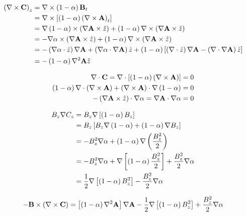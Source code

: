 \begin{equation}
    \begin{split}
        \left( \nabla \times\mathbf{C} \right)_z &= \nabla \times\left( 1-\alpha \right)\mathbf{B}_t \\
        &= \nabla \times\left[ \left( 1-\alpha \right)\left( \nabla \times\mathbf{A} \right)_t \right] \\
        &= \nabla\left( 1-\alpha \right)\times\left( \nabla\mathbf{A}\times\hat{z} \right) + \left( 1-\alpha \right)\nabla \times \left( \nabla\mathbf{A}\times\hat{z} \right) \\
        &= -\nabla\alpha\times\left( \nabla\mathbf{A}\times\hat{z} \right) + \left( 1-\alpha \right)\nabla \times \left( \nabla\mathbf{A}\times\hat{z} \right) \\
        &= -\left( \nabla\alpha\cdot\hat{z} \right)\nabla\mathbf{A} + \left( \nabla\alpha\cdot\nabla\mathbf{A} \right)\hat{z} + \left( 1-\alpha \right)\left[ \left( \nabla \cdot\hat{z} \right)\nabla\mathbf{A} - \left( \nabla \cdot\nabla\mathbf{A} \right)\hat{z} \right] \\
        &= -\left( 1-\alpha \right)\nabla^2\mathbf{A}\hat{z} \\
    \end{split}
\end{equation}


\[\begin{split}
    \nabla \cdot\mathbf{C} = \nabla \cdot\left[ \left( 1-\alpha \right)\left( \nabla \times\mathbf{A} \right) \right] &= 0 \\
    \left( 1-\alpha \right)\nabla \cdot \left( \nabla \times\mathbf{A} \right) + \left( \nabla \times\mathbf{A} \right)\cdot\nabla\left( 1-\alpha \right) &= 0 \\
    -\left( \nabla\mathbf{A}\times\hat{z} \right)\cdot\nabla{\alpha} = \nabla\mathbf{A}\cdot\nabla\alpha &= 0 \\
\end{split}\]

\begin{equation}
    \begin{split}
        B_z\nabla C_z &= B_z\nabla\left[ \left( 1-\alpha \right)B_z \right] \\
        &= B_z\left[ B_z\nabla\left( 1-\alpha \right) + \left( 1-\alpha \right)\nabla B_z \right] \\
        &= -B_z^2\nabla\alpha + \left( 1-\alpha \right)\nabla\left( \frac{B_z^2}{2} \right) \\
        &= -B_z^2\nabla\alpha + \nabla\left[ \left( 1-\alpha \right)\frac{B_z^2}{2} \right] + \frac{B_z^2}{2}\nabla\alpha \\
        &= \frac{1}{2}\nabla\left[ \left( 1-\alpha \right)B_z^2 \right] - \frac{B_z^2}{2}\nabla\alpha
    \end{split}
\end{equation}

\begin{equation}
    -\mathbf{B}\times\left( \nabla \times\mathbf{C} \right) = \left[ \left( 1-\alpha \right)\nabla^2\mathbf{A} \right] \nabla\mathbf{A} - \frac{1}{2}\nabla\left[ \left( 1-\alpha \right)B_z^2 \right] + \frac{B_z^2}{2}\nabla\alpha
\end{equation}

